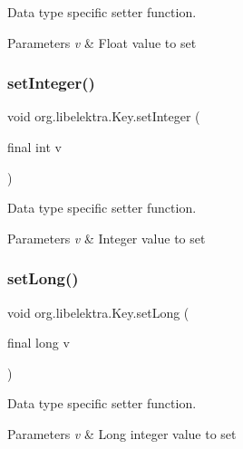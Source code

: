 Data type specific setter function. 


\begin{DoxyParams}{Parameters}
{\em v} & Float value to set \\
\hline
\end{DoxyParams}
\mbox{\label{classorg_1_1libelektra_1_1Key_a290d278b4c11ea4bcabf82c0c97e6350}} 
\subsubsection{\texorpdfstring{set\+Integer()}{setInteger()}}
{\footnotesize\ttfamily void org.\+libelektra.\+Key.\+set\+Integer (\begin{DoxyParamCaption}\item[{final int}]{v }\end{DoxyParamCaption})\hspace{0.3cm}{\ttfamily [inline]}}



Data type specific setter function. 


\begin{DoxyParams}{Parameters}
{\em v} & Integer value to set \\
\hline
\end{DoxyParams}
\mbox{\label{classorg_1_1libelektra_1_1Key_ac02de55fc0a3eb10372de7fa146db937}} 
\subsubsection{\texorpdfstring{set\+Long()}{setLong()}}
{\footnotesize\ttfamily void org.\+libelektra.\+Key.\+set\+Long (\begin{DoxyParamCaption}\item[{final long}]{v }\end{DoxyParamCaption})\hspace{0.3cm}{\ttfamily [inline]}}



Data type specific setter function. 


\begin{DoxyParams}{Parameters}
{\em v} & Long integer value to set \\
\hline
\end{DoxyParams}
\mbox{\label{classorg_1_1libelektra_1_1Key_ac8c73ca3d16cf4454bd326ebe469cf2d}} 
